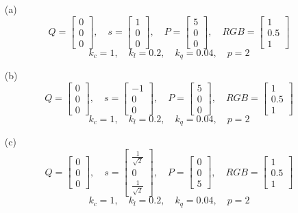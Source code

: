 \begin{enumerate}
    \item[(a)] 
    \[
    Q = \begin{bmatrix} 0 \\ 0 \\ 0 \end{bmatrix}, 
    \quad s = \begin{bmatrix} 1 \\ 0 \\ 0 \end{bmatrix}, 
    \quad P = \begin{bmatrix} 5 \\ 0 \\ 0 \end{bmatrix}, 
    \quad RGB = \begin{bmatrix} 1 \\ 0.5 \\ 1 \end{bmatrix}
    \]
    \[
    k_c = 1, \quad k_l = 0.2, \quad k_q = 0.04, \quad p = 2
    \]

    \item[(b)] 
    \[
    Q = \begin{bmatrix} 0 \\ 0 \\ 0 \end{bmatrix}, 
    \quad s = \begin{bmatrix} -1 \\ 0 \\ 0 \end{bmatrix}, 
    \quad P = \begin{bmatrix} 5 \\ 0 \\ 0 \end{bmatrix}, 
    \quad RGB = \begin{bmatrix} 1 \\ 0.5 \\ 1 \end{bmatrix}
    \]
    \[
    k_c = 1, \quad k_l = 0.2, \quad k_q = 0.04, \quad p = 2
    \]

    \item[(c)] 
    \[
    Q = \begin{bmatrix} 0 \\ 0 \\ 0 \end{bmatrix}, 
    \quad s = \begin{bmatrix} \frac{1}{\sqrt{2}} \\ 0 \\ \frac{1}{\sqrt{2}} \end{bmatrix}, 
    \quad P = \begin{bmatrix} 0 \\ 0 \\ 5 \end{bmatrix}, 
    \quad RGB = \begin{bmatrix} 1 \\ 0.5 \\ 1 \end{bmatrix}
    \]
    \[
    k_c = 1, \quad k_l = 0.2, \quad k_q = 0.04, \quad p = 2
    \]
\end{enumerate}
